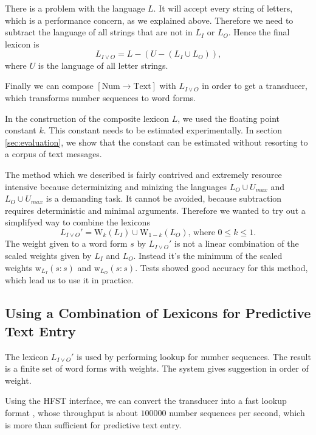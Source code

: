 \documentclass[a4paper,conference]{IEEEtran}
\begin{document}
There is a problem with the language $L$. It will accept every
string of letters, which is a performance concern, as we explained
above. Therefore we need to subtract the language of all strings that
are not in $L_I$ or $L_O$. Hence the final lexicon is
\begin{equation}L_{I\vee O} = L - (U - (L_I \cup L_O))\text{,}\end{equation}
where $U$ is the language of all letter strings.

Finally we can compose $[\mathrm{Num}\rightarrow\mathrm{Text}]$ with
$L_{I\vee O}$ in order to get a transducer, which transforms number
sequences to word forms.

In the construction of the composite lexicon $L$, we used the floating
point constant $k$. This constant needs to be estimated
experimentally. In section \ref{sec:evaluation}, we show that the
constant can be estimated without resorting to a corpus of text messages.

The method which we described is fairly contrived and extremely
resource intensive because determinizing and minizing the languages
$L_O \cup U_{max}$ and $L_O \cup U_{max}$ is a demanding task. It
cannot be avoided, because subtraction requires deterministic and
minimal arguments. Therefore we wanted to try out a simplifyed way to
combine the lexicons
\begin{equation}
  L_{I\vee O}' = \mathrm{W}_k(L_I) \cup \mathrm{W}_{1-k}(L_O)\text{, where }0 \leq k \leq 1\text{.}
\end{equation} 
The weight given to a word form $s$ by $L_{I\vee O}'$ is not a linear
combination of the scaled weights given by $L_I$ and $L_O$. Instead
it's the minimum of the scaled weights
$\mathrm{w}_{L_I}(s\mathrm{:}s)$ and $\mathrm{w}_{L_O}(s\mathrm{:}s)$.
Tests showed good accuracy for this method, which lead us to use it in
practice.

\subsection{Using a Combination of Lexicons for Predictive Text Entry}

The lexicon $L_{I\vee O}'$ is used by performing lookup for number
sequences. The result is a finite set of word forms with weights. The
system gives suggestion in order of weight.

Using the HFST interface, we can convert the transducer into a fast
lookup format \cite{conf/fsmnlp/Silfverberg2009}, whose throughput is
about $100000$ number sequences per second, which is more than
sufficient for predictive text entry.
\end{document}
